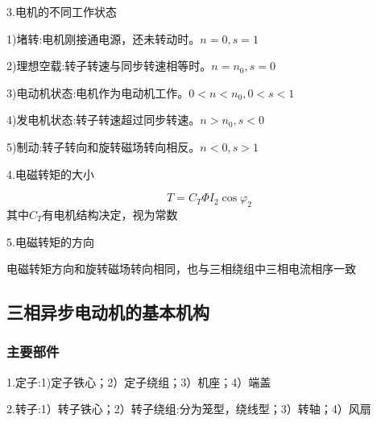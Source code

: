 \documentclass[11pt,twoside,a4paper]{ctexart}
\begin{document}
3.电机的不同工作状态
\begin{minipage}[t]{0.9\linewidth}
    1)堵转:电机刚接通电源，还未转动时。$n = 0,s = 1$

    2)理想空载:转子转速与同步转速相等时。$n = n_0,s = 0$

    3)电动机状态:电机作为电动机工作。$0<n<n_0,0<s<1$

    4)发电机状态:转子转速超过同步转速。$n>n_0,s<0$

    5)制动:转子转向和旋转磁场转向相反。$n<0,s>1$
    
\end{minipage}

4.电磁转矩的大小

\[T = C_T\varPhi I_2 \cos \varphi _2\]
其中$C_T$有电机结构决定，视为常数

5.电磁转矩的方向

电磁转矩方向和旋转磁场转向相同，也与三相绕组中三相电流相序一致

\subsection{三相异步电动机的基本机构}

\subsubsection{主要部件}
1.定子:1)定子铁心；2）定子绕组；3）机座；4）端盖

2.转子:1）转子铁心；2）转子绕组:分为笼型，绕线型；3）转轴；4）风扇
\end{document}
